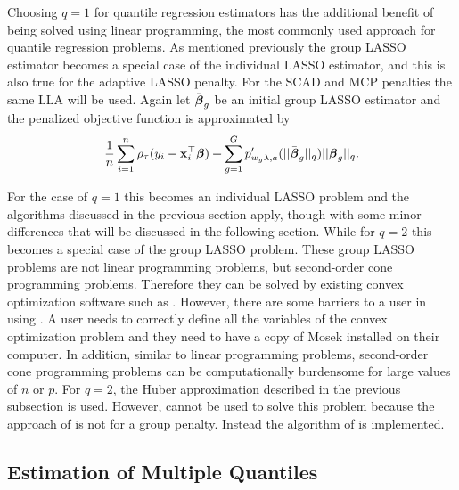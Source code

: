 \documentclass[article]{rqPenVignette}%
\newcommand{\vx}{{\bf x}}
\newcommand{\vbeta}{\mbox{\boldmath $\beta$}}
\begin{document}
Choosing $q=1$ for quantile regression estimators has the additional benefit of being solved using linear programming, the most commonly used approach for quantile regression problems. As mentioned previously the group LASSO estimator becomes a special case of the individual LASSO estimator, and this is also true for the adaptive LASSO penalty. For the SCAD and MCP penalties the same LLA will be used. Again let $\bar{\vbeta}_g$ be an initial group LASSO estimator and the penalized objective function is approximated by 
\begin{equation}
\label{groupFormlla}
\frac{1}{n} \sum_{i=1}^n \rho_\tau(y_i - \vx_i^\top\vbeta) + \sum_{g=1}^G p'_{w_g\lambda,a}(||\bar{\vbeta}_g||_q)||\vbeta_g||_q.
\end{equation}

For the case of $q=1$ this becomes an individual LASSO problem and the algorithms discussed in the previous section apply, though with some minor differences that will be discussed in the following section. While for $q=2$ this becomes a special case of the group LASSO problem. These group LASSO problems are not linear programming problems, but second-order cone programming problems. Therefore they can be solved by existing convex optimization software such as  \citep{JSSv060i05}. However, there are some barriers to a user in using . A user needs to correctly define all the variables of the convex optimization problem and they need to have a copy of Mosek installed on their computer. In addition, similar to linear programming problems, second-order cone programming problems can be computationally burdensome for large values of $n$ or $p$. For $q=2$, the Huber approximation described in the previous subsection is used. However,  cannot be used to solve this problem because the approach of \citet{huber_cd} is not for a group penalty. Instead the algorithm of \citet{Yang2015} is implemented. %


\subsection{Estimation of Multiple Quantiles}
\end{document}
